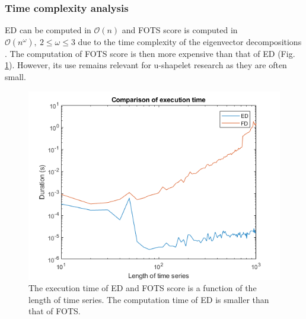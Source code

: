 \subsubsection{Time complexity analysis} ED can be computed in $\mathcal{O}(n)$ and  FOTS score is computed in $\mathcal{O}(n^\omega),\:2\leq\omega\leq3$ due to the time complexity of the eigenvector decompositions \cite{pan1999complexity}. The computation of FOTS score is then more expensive than that of ED (Fig. \ref{timecomparison}). However, its use remains relevant for u-shapelet research as they are often small.


\begin{figure}[h]
\centering
 \includegraphics[scale=0.50]{images/temps_ED_FOTS}
\caption{The execution time of ED and FOTS score is a function of the length of time series. The computation time of ED is smaller than that of FOTS.}
\label{timecomparison}
\end{figure}



